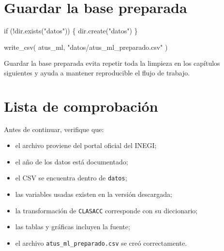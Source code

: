 \documentclass[
  spanish,
  10.5pt,
  letterpaper,
  openany,
  headings=big]{scrbook}
\newenvironment{Shaded}{}{}
\newcommand{\ControlFlowTok}[1]{\textcolor[rgb]{0.84,0.23,0.29}{#1}}
\newcommand{\FunctionTok}[1]{\textcolor[rgb]{0.44,0.26,0.76}{#1}}
\newcommand{\NormalTok}[1]{\textcolor[rgb]{0.14,0.16,0.18}{#1}}
\newcommand{\SpecialCharTok}[1]{\textcolor[rgb]{0.00,0.36,0.77}{#1}}
\newcommand{\StringTok}[1]{\textcolor[rgb]{0.01,0.18,0.38}{#1}}
\providecommand{\tightlist}{%
  \setlength{\itemsep}{0pt}\setlength{\parskip}{0pt}}
\begin{document}
\section{Guardar la base preparada}\label{guardar-la-base-preparada}

\begin{Shaded}
\begin{Highlighting}[]
\ControlFlowTok{if}\NormalTok{ (}\SpecialCharTok{!}\FunctionTok{dir.exists}\NormalTok{(}\StringTok{"datos"}\NormalTok{)) \{}
  \FunctionTok{dir.create}\NormalTok{(}\StringTok{"datos"}\NormalTok{)}
\NormalTok{\}}

\FunctionTok{write\_csv}\NormalTok{(}
\NormalTok{  atus\_ml,}
  \StringTok{"datos/atus\_ml\_preparado.csv"}
\NormalTok{)}
\end{Highlighting}
\end{Shaded}

\begin{tcolorbox}[enhanced jigsaw, arc=.35mm, bottomrule=.15mm, bottomtitle=1mm, breakable, colback=white, colbacktitle=quarto-callout-note-color!10!white, colframe=quarto-callout-note-color-frame, coltitle=black, left=2mm, leftrule=.75mm, opacityback=0, opacitybacktitle=0.6, rightrule=.15mm, title=\textcolor{quarto-callout-note-color}{\faInfo}\hspace{0.5em}{Explicación del código}, titlerule=0mm, toprule=.15mm, toptitle=1mm]

Guardar la base preparada evita repetir toda la limpieza en los
capítulos siguientes y ayuda a mantener reproducible el flujo de
trabajo.

\end{tcolorbox}

\section{Lista de comprobación}\label{lista-de-comprobaciuxf3n}

Antes de continuar, verifique que:

\begin{itemize}
\tightlist
\item
  el archivo proviene del portal oficial del INEGI;
\item
  el año de los datos está documentado;
\item
  el CSV se encuentra dentro de \texttt{datos};
\item
  las variables usadas existen en la versión descargada;
\item
  la transformación de \texttt{CLASACC} corresponde con su diccionario;
\item
  las tablas y gráficas incluyen la fuente;
\item
  el archivo \texttt{atus\_ml\_preparado.csv} se creó correctamente.
\end{itemize}
\end{document}
